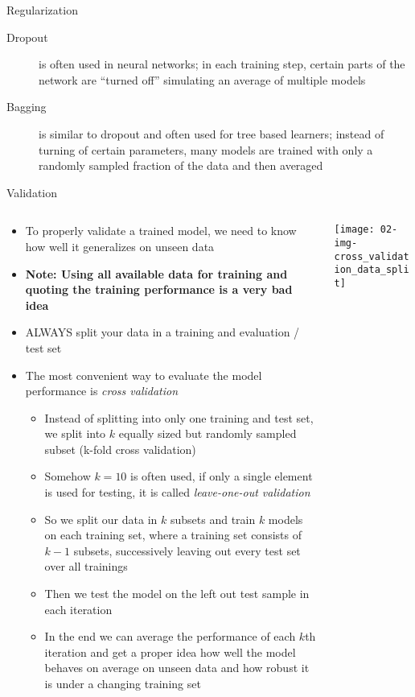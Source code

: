 \begin{frame}{Regularization}
\begin{itemize}
        \begin{description}
          \item[Dropout] is often used in neural networks; in each training step, certain parts of the network are \enquote{turned off} simulating an average of multiple models
          \item[Bagging] is similar to dropout and often used for tree based learners; instead of turning of certain parameters, many models are trained with only a randomly sampled fraction of the data and then averaged
        \end{description}
      \end{itemize}
    \end{frame}

    \begin{frame}{Validation}
      \begin{columns}
        \begin{column}{0.7\textwidth}
          \begin{itemize}
            \item To properly validate a trained model, we need to know how well it generalizes on unseen data
            \item \textbf{Note: Using all available data for training and quoting the training performance is a very bad idea}
            \item ALWAYS split your data in a training and evaluation / test set
            \item The most convenient way to evaluate the model performance is \emph{cross validation}
            \begin{itemize}
              \item Instead of splitting into only one training and test set, we split into $k$ equally sized but randomly sampled subset (k-fold cross validation)
              \item Somehow $k=10$ is often used, if only a single element is used for testing, it is called \emph{leave-one-out validation}
              \item So we split our data in $k$ subsets and train $k$ models on each training set, where a training set consists of $k-1$ subsets, successively leaving out every test set over all trainings
              \item Then we test the model on the left out test sample in each iteration
              \item In the end we can average the performance of each $k$th iteration and get a proper idea how well the model behaves on average on unseen data and how robust it is under a changing training set
            \end{itemize}
          \end{itemize}
        \end{column}
        \begin{column}{0.3\textwidth}
          \texttt{[image: 02-img-cross\_validation\_data\_split]}


\end{column}
\end{columns}
\end{frame}
